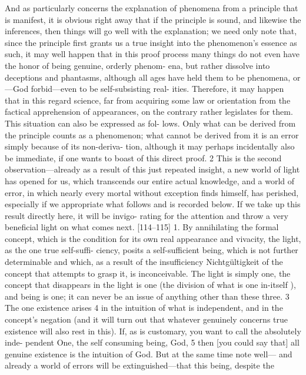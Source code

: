 And as particularly concerns the explanation of phenomena from a
principle that is manifest, it is obvious right away that if the principle is sound,
and likewise the inferences, then things will go well with the explanation; we
need only note that, since the principle first grants us a true insight into the
phenomenon’s essence as such, it may well happen that in this proof process
many things do not even have the honor of being genuine, orderly phenom-
ena, but rather dissolve into deceptions and phantasms, although all ages have
held them to be phenomena, or—God forbid—even to be self-subsisting real-
ities. Therefore, it may happen that in this regard science, far from acquiring
some law or orientation from the factical apprehension of appearances, on the
contrary rather legislates for them. This situation can also be expressed as fol-
lows. Only what can be derived from the principle counts as a phenomenon;
what cannot be derived from it is an error simply because of its non-deriva-
tion, although it may perhaps incidentally also be immediate, if one wants to
boast of this direct proof. 2
This is the second observation—already as a result of this just repeated
insight, a new world of light has opened for us, which transcends our entire
actual knowledge, and a world of error, in which nearly every mortal without
exception finds himself, has perished, especially if we appropriate what follows
and is recorded below. If we take up this result directly here, it will be invigo-
rating for the attention and throw a very beneficial light on what comes next.
[114–115] 1. By annihilating the formal concept, which is the condition
for its own real appearance and vivacity, the light, as the one true self-suffi-
ciency, posits a self-sufficient being, which is not further determinable and
which, as a result of the insufficiency {Nichtgültigkeit} of the concept that
attempts to grasp it, is inconceivable. The light is simply one, the concept that
disappears in the light is one (the division of what is one in-itself ), and being
is one; it can never be an issue of anything other than these three. 3 The one
existence arises 4 in the intuition of what is independent, and in the concept’s
negation (and it will turn out that whatever genuinely concerns true existence
will also rest in this). If, as is customary, you want to call the absolutely inde-
pendent One, the self consuming being, God, 5 then [you could say that] all
genuine existence is the intuition of God. But at the same time note well—
and already a world of errors will be extinguished—that this being, despite the
